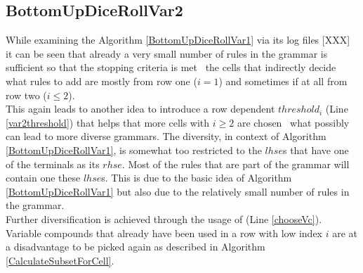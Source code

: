 \noindent
{}

\pagebreak
\subsection{BottomUpDiceRollVar2}
While examining the Algorithm \ref{BottomUpDiceRollVar1} via its log files [XXX] it can be seen that already a very small number of rules in the grammar is sufficient so that the stopping criteria  is met \textendash~the cells that indirectly decide what rules to add are mostly from row one ($i=1$) and sometimes if at all from row two ($i\leq2$).\\ 
This again leads to another idea to introduce a row dependent $threshold_i$ (Line \ref{var2threshold}) that helps that more cells with $i\geq2$ are chosen \textendash~what possibly can lead to more diverse grammars. The diversity, in context of Algorithm \ref{BottomUpDiceRollVar1}, is somewhat too restricted to the $lhse$s that have one of the terminals as its $rhse$. Most of the rules that are part of the grammar will contain one these $lhse$s. This is due to the basic idea of Algorithm \ref{BottomUpDiceRollVar1} but also due to the relatively small number of rules in the grammar. \\
Further diversification is achieved through the usage of  (Line \ref{chooseVc}). Variable compounds that already have been used in a row with low index $i$ are at a disadvantage to be picked again as described in Algorithm \ref{CalculateSubsetForCell}.\\

